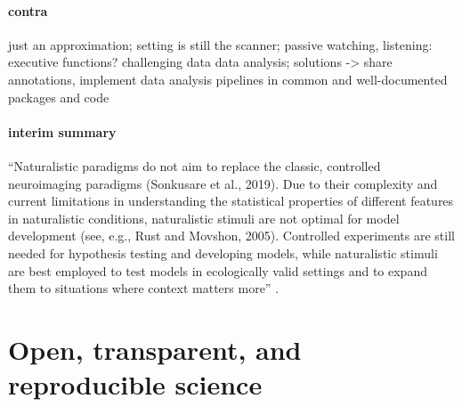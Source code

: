 \paragraph{contra}
%
just an approximation;
%
setting is still the scanner;
%
passive watching, listening: executive functions?
%
challenging data data analysis;
%
solutions -> share annotations,
%
implement data analysis pipelines in common and well-documented packages and code


\paragraph{interim summary}

``Naturalistic paradigms do not aim to replace the classic, controlled
neuroimaging paradigms (Sonkusare et al., 2019). Due to their complexity and
current limitations in understanding the statistical properties of different
features in naturalistic conditions, naturalistic stimuli are not optimal for
model development (see, e.g., Rust and Movshon, 2005). Controlled experiments
are still needed for hypothesis testing and developing models, while
naturalistic stimuli are best employed to test models in ecologically valid
settings and to expand them to situations where context matters
more'' \citep{saarimaki2021naturalistic}.



\section{Open, transparent, and reproducible science}



